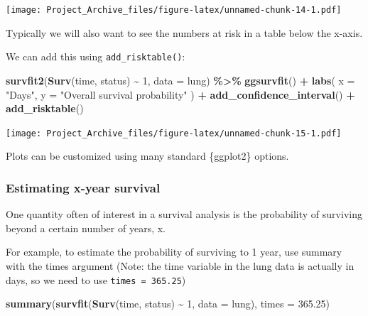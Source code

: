 \documentclass[
]{book}
\newenvironment{Shaded}{\begin{snugshade}}{\end{snugshade}}
\newcommand{\AttributeTok}[1]{\textcolor[rgb]{0.13,0.29,0.53}{#1}}
\newcommand{\DecValTok}[1]{\textcolor[rgb]{0.00,0.00,0.81}{#1}}
\newcommand{\FloatTok}[1]{\textcolor[rgb]{0.00,0.00,0.81}{#1}}
\newcommand{\FunctionTok}[1]{\textcolor[rgb]{0.13,0.29,0.53}{\textbf{#1}}}
\newcommand{\NormalTok}[1]{#1}
\newcommand{\SpecialCharTok}[1]{\textcolor[rgb]{0.81,0.36,0.00}{\textbf{#1}}}
\newcommand{\StringTok}[1]{\textcolor[rgb]{0.31,0.60,0.02}{#1}}
\begin{document}
\texttt{[image: Project\_Archive\_files/figure-latex/unnamed-chunk-14-1.pdf]}

Typically we will also want to see the numbers at risk in a table below the x-axis.

We can add this using \texttt{add\_risktable()}:

\begin{Shaded}
\begin{Highlighting}[]
\FunctionTok{survfit2}\NormalTok{(}\FunctionTok{Surv}\NormalTok{(time, status) }\SpecialCharTok{\textasciitilde{}} \DecValTok{1}\NormalTok{, }\AttributeTok{data =}\NormalTok{ lung) }\SpecialCharTok{\%\textgreater{}\%} 
  \FunctionTok{ggsurvfit}\NormalTok{() }\SpecialCharTok{+}
  \FunctionTok{labs}\NormalTok{(}
    \AttributeTok{x =} \StringTok{"Days"}\NormalTok{,}
    \AttributeTok{y =} \StringTok{"Overall survival probability"}
\NormalTok{    ) }\SpecialCharTok{+} 
  \FunctionTok{add\_confidence\_interval}\NormalTok{() }\SpecialCharTok{+}
  \FunctionTok{add\_risktable}\NormalTok{()}
\end{Highlighting}
\end{Shaded}

\texttt{[image: Project\_Archive\_files/figure-latex/unnamed-chunk-15-1.pdf]}

Plots can be customized using many standard \{ggplot2\} options.

\hypertarget{estimating-x-year-survival}{%
\subsubsection{Estimating x-year survival}\label{estimating-x-year-survival}}

One quantity often of interest in a survival analysis is the probability of surviving beyond a certain number of years, x.

For example, to estimate the probability of surviving to 1 year, use summary with the times argument
(Note: the time variable in the lung data is actually in days, so we need to use \texttt{times\ =\ 365.25})

\begin{Shaded}
\begin{Highlighting}[]
\FunctionTok{summary}\NormalTok{(}\FunctionTok{survfit}\NormalTok{(}\FunctionTok{Surv}\NormalTok{(time, status) }\SpecialCharTok{\textasciitilde{}} \DecValTok{1}\NormalTok{, }\AttributeTok{data =}\NormalTok{ lung), }\AttributeTok{times =} \FloatTok{365.25}\NormalTok{)}
\end{Highlighting}
\end{Shaded}
\end{document}
